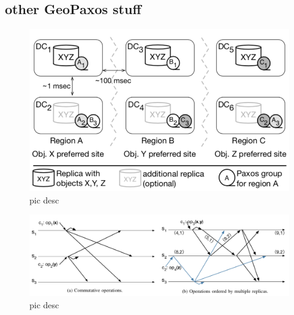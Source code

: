 \subsection{other GeoPaxos stuff}
\begin{figure}[htb]
  \centering
  \includegraphics[width=\textwidth,height=\textheight,keepaspectratio]{img/datacenters.png}

  \caption[The architecture of the system]{ pic desc }
  \label{fig:datacenters}
\end{figure}
\begin{figure}[htb]
  \centering
  \includegraphics[width=\textwidth,height=\textheight,keepaspectratio]{img/partial-ordering.png}

  \caption[The architecture of the system]{ pic desc }
  \label{fig:partial-ordering}
\end{figure}
